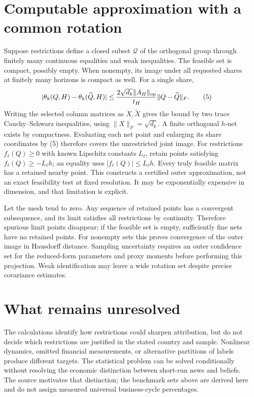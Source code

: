 \documentclass[11pt,a4paper]{article}
\begin{document}
\section{Computable approximation with a common rotation}
Suppose restrictions define a closed subset $\mathcal Q$ of the orthogonal group through finitely many continuous equalities and weak inequalities. The feasible set is compact, possibly empty. When nonempty, its image under all requested shares at finitely many horizons is compact as well. For a single share,
\[
 |\theta_k(Q,H)-\theta_k(\widetilde Q,H)|
 \le \frac{2\sqrt{d_k}\|A_H\|_{\rm op}}{t_H}\|Q-\widetilde Q\|_F. \tag{5}
\]
Writing the selected column matrices as $X,\widetilde X$ gives the bound by two trace Cauchy--Schwarz inequalities, using $\|X\|_F=\sqrt{d_k}$. A finite orthogonal $h$-net exists by compactness. Evaluating each net point and enlarging its share coordinates by (5) therefore covers the unrestricted joint image. For restrictions $f_\ell(Q)\ge0$ with known Lipschitz constants $L_\ell$, retain points satisfying $f_\ell(Q)\ge-L_\ell h$; an equality uses $|f_\ell(Q)|\le L_\ell h$. Every truly feasible matrix has a retained nearby point. This constructs a certified outer approximation, not an exact feasibility test at fixed resolution. It may be exponentially expensive in dimension, and that limitation is explicit.

Let the mesh tend to zero. Any sequence of retained points has a convergent subsequence, and its limit satisfies all restrictions by continuity. Therefore spurious limit points disappear; if the feasible set is empty, sufficiently fine nets have no retained points. For nonempty sets this proves convergence of the outer image in Hausdorff distance. Sampling uncertainty requires an outer confidence set for the reduced-form parameters and proxy moments before performing this projection. Weak identification may leave a wide rotation set despite precise covariance estimates.

\section{What remains unresolved}
The calculations identify how restrictions could sharpen attribution, but do not decide which restrictions are justified in the stated country and sample. Nonlinear dynamics, omitted financial measurements, or alternative partitions of labels produce different targets. The statistical problem can be solved conditionally without resolving the economic distinction between short-run news and beliefs. The source motivates that distinction; the benchmark sets above are derived here and do not assign measured universal business-cycle percentages.
\end{document}
